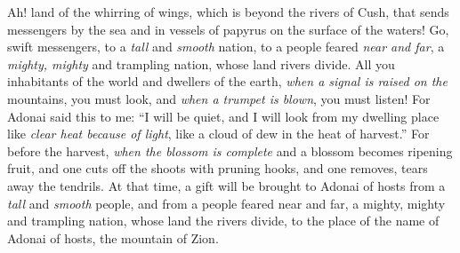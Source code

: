 \begin{biblechapter} %
 Ah! land of the whirring of wings, 
which is beyond the rivers of Cush,
\verse that sends messengers by the sea 
and in vessels of papyrus on the surface of the waters! 
Go, swift messengers, to a \textit{tall} and \textit{smooth} nation, 
to a people feared \textit{near and far}, 
a \textit{mighty, mighty} and trampling nation, 
whose land rivers divide.
\verse All you inhabitants of the world 
and dwellers of the earth, 
\textit{when a signal is raised on the} mountains, you must look, 
and \textit{when a trumpet is blown}, you must listen!
\verse For Adonai said this to me:
\verse “I will be quiet, 
and I will look from my dwelling place 
like \textit{clear heat because of light}, 
like a cloud of dew in the heat of harvest.”
\verse For before the harvest, \textit{when the blossom is complete} 
and a blossom becomes ripening fruit, 
and one cuts off the shoots with pruning hooks, 
and one removes, tears away the tendrils.
\verse At that time, a gift will be brought to Adonai of hosts from a \textit{tall} and \textit{smooth} people, 
and from a people feared near and far, 
a mighty, mighty and trampling nation, 
whose land the rivers divide, 
to the place of the name of Adonai of hosts, 
the mountain of Zion.
\end{biblechapter}

